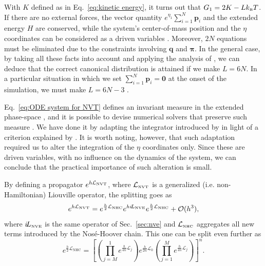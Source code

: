 \documentclass[
journal=jctcce,
layout=twocolumn
]{achemso}
\newcommand{\vt}[1]{\boldsymbol{\mathbf{#1}}}   %
\newcommand{\Liu}[1]{i\!L_\text{#1}}            %
\newcommand{\timestep}{h}
\begin{document}
With $K$ defined as in Eq.~\eqref{eq:kinetic energy}, it turns out that $G_1 = 2K - L k_\text{\tiny B} T$.
If there are no external forces, the vector quantity $e^{\eta_1}\sum_{i=1}^N {\vt p}_i$ and the extended energy $H$ are conserved, while the system's center-of-mass position and the $\eta$ coordinates can be considered as a driven variables \cite{Tuckerman_2001}.
Moreover, $2N$ equations must be eliminated due to the constraints involving $\vt q$ and $\vt \pi$.
In the general case, by taking all these facts into account and applying the analysis of \citeauthor{Tuckerman_2001} \cite{Tuckerman_2001}, we can deduce that the correct canonical distribution is attained if we make $L = 6N$.
In a particular situation in which we set $\sum_{i=1}^N {\vt p}_i = \vt 0$ at the onset of the simulation, we must make $L = 6N - 3$ \cite{Martyna_1994}.

Eq.~\eqref{eq:ODE system for NVT} defines an invariant measure in the extended phase-space \cite{Tuckerman_1999}, and it is possible to devise numerical solvers that preserve such measure \cite{Sergi_2001, Ezra_2004, Ezra_2006}.
We have done it by adapting the integrator introduced by \citeauthor{Martyna_1996} \cite{Martyna_1996} in light of a criterion explained by \citeauthor{Ezra_2006} \cite{Ezra_2006}.
It is worth noting, however, that such adaptation required us to alter the integration of the $\eta$ coordinates only.
Since these are driven variables, with no influence on the dynamics of the system, we can conclude that the practical importance of such alteration is small.

By defining a propagator $e^{\timestep \mathcal{L}_\text{\tiny NVT}}$, where $\mathcal{L}_\text{\tiny NVT}$ is a generalized (i.e. non-Hamiltonian) Liouville operator, the splitting goes as
\begin{equation}
\label{eq:splitting NVT}
e^{\timestep \mathcal{L}_\text{\tiny NVT}} = e^{\frac{\timestep}{2} \mathcal{L}_\text{\tiny NHC}} e^{\timestep \Liu{\tiny NVE}} e^{\frac{\timestep}{2} \mathcal{L}_\text{\tiny NHC}} + \mathcal{O}(\timestep^3),
\end{equation}
where $\Liu{\tiny NVE}$ is the same operator of Sec.~\ref{sec:nve} and $\mathcal{L}_\text{\tiny NHC}$ aggregates all new terms introduced by the Nos\'e-Hoover chain.
This one can be split even further as
\begin{equation*}
e^{\frac{\timestep}{2} \mathcal{L}_\text{NHC}} = \left[ \left( \textstyle\prod\limits_{j=M}^1 e^{\frac{\timestep}{4n} \mathcal{L}_j }\right) e^{\frac{\timestep}{2n} \mathcal{L}_0 } \left(  \textstyle\prod\limits_{j=1}^M e^{\frac{\timestep}{4n} \mathcal{L}_j }\right)  \right]^n.
\end{equation*}
\end{document}
